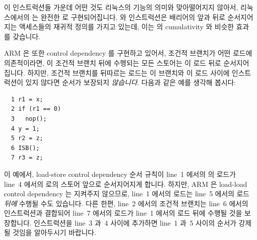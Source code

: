 이 인스트럭션들 가운데 어떤 것도 리눅스의  기능의 의미와 맞아떨어지지
않아서, 리눅스에서의  는 완전한  로 구현되어집니다.
 와  인스트럭션은 배리어의 앞과 뒤로 순서지어지는 액세스들의
재귀적 정의를 가지고 있는데, 이는 \Power{} 의 cumulativity 와 비슷한 효과를
갖습니다.

ARM 은 또한 control dependency 를 구현하고 있어서, 조건적 브랜치가 어떤 로드에
의존적이라면, 이 조건적 브랜치 뒤에 수행되는 모든 스토어는 이 로드 뒤로
순서지어집니다.
하지만, 조건적 브랜치를 뒤따르는 로드는 이 브랜치와 이 로드 사이에 
인스트럭션이 있지 않다면 순서가 보장되지 \emph{않습니다}.
다음과 같은 예를 생각해 봅시다:

\vspace{5pt}
\begin{minipage}[t]{\columnwidth}
\small
\begin{verbatim}
  1 r1 = x;
  2 if (r1 == 0)
  3   nop();
  4 y = 1;
  5 r2 = z;
  6 ISB();
  7 r3 = z;
\end{verbatim}
\end{minipage}
\vspace{5pt}

이 예에서, load-store control dependency 순서 규칙이 line~1 에서의  의
로드가 line~4 에서의  로의 스토어 앞으로 순서지어지게 합니다.
하지만, ARM 은 load-load control dependency 는 지켜주지 않으므로, line~1 에서의
로드는 line~5 에서의 로드 \emph{뒤에} 수행될 수도 있습니다.
다른 한편, line~2 에서의 조건적 브랜치는 line~6 에서의  인스트럭션과
결합되어 line~7 에서의 로드가 line~1 에서의 로드 뒤에 수행될 것을 보장합니다.
 인스트럭션을 line~3 과~4 사이에 추가하면 line~1 과~5 사이의 순서가
강제될 것임을 알아두시기 바랍니다.
\iffalse

